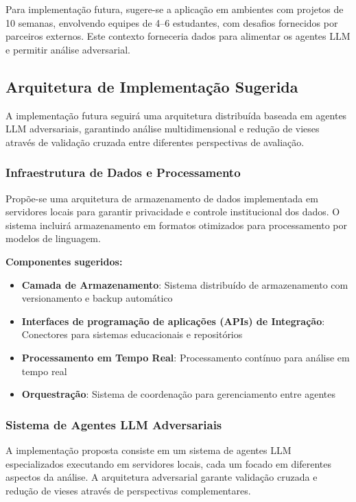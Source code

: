 \documentclass[english, spanish, brazilian]{modelo_dt}
\begin{document}
Para implementação futura, sugere-se a aplicação em ambientes com projetos de
10 semanas, envolvendo equipes de 4--6 estudantes, com desafios fornecidos por
parceiros externos. Este contexto forneceria dados para alimentar os agentes
LLM e permitir análise adversarial.

\subsection{Arquitetura de Implementação Sugerida}

A implementação futura seguirá uma arquitetura distribuída baseada em agentes
LLM adversariais, garantindo análise multidimensional e redução de vieses
através de validação cruzada entre diferentes perspectivas de avaliação.

\subsubsection{Infraestrutura de Dados e Processamento}

Propõe-se uma arquitetura de armazenamento de dados implementada em servidores
locais para garantir privacidade e controle institucional dos dados. O sistema
incluirá armazenamento em formatos otimizados para processamento por modelos de
linguagem.

\textbf{Componentes sugeridos:}
\begin{itemize}
  \item \textbf{Camada de Armazenamento}: Sistema distribuído de armazenamento com versionamento e backup automático
  \item \textbf{Interfaces de programação de aplicações (APIs) de Integração}: Conectores para sistemas educacionais e repositórios
  \item \textbf{Processamento em Tempo Real}: Processamento contínuo para análise em tempo real
  \item \textbf{Orquestração}: Sistema de coordenação para gerenciamento entre agentes
\end{itemize}

\subsubsection{Sistema de Agentes LLM Adversariais}

A implementação proposta consiste em um sistema de agentes LLM especializados
executando em servidores locais, cada um focado em diferentes aspectos da
análise. A arquitetura adversarial garante validação cruzada e redução de
vieses através de perspectivas complementares.
\end{document}
